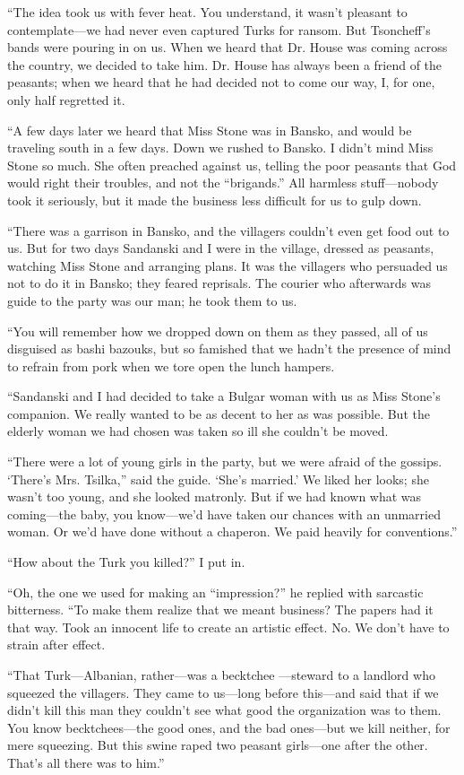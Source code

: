 \documentclass[a5paper,12pt]{book}
\begin{document}
“The idea took us with fever heat. You understand, it wasn’t pleasant to contemplate—we had never even captured Turks for ransom. But Tsoncheff’s bands were pouring in on us. When we heard that Dr. House was coming across the country, we decided to take him. Dr. House has always been a friend of the peasants; when we heard that he had decided not to come our way, I, for one, only half regretted it.

“A few days later we heard that Miss Stone was in Bansko, and would be traveling south in a few days. Down we rushed to Bansko. I didn’t mind Miss Stone so much. She often preached against us, telling the poor peasants that God would right their troubles, and not the “brigands.” All harmless stuff—nobody took it seriously, but it made the business less difficult for us to gulp down.

“There was a garrison in Bansko, and the villagers couldn’t even get food out to us. But for two days Sandanski and I were in the village, dressed as peasants, watching Miss Stone and arranging plans. It was the villagers who persuaded us not to do it in Bansko; they feared reprisals. The courier who afterwards was guide to the party was our man; he took them to us.

“You will remember how we dropped down on them as they passed, all of us disguised as bashi bazouks, but so famished that we hadn’t the presence of mind to refrain from pork when we tore open the lunch hampers.

“Sandanski and I had decided to take a Bulgar woman with us as Miss Stone’s companion. We really wanted to be as decent to her as was possible. But the elderly woman we had chosen was taken so ill she couldn’t be moved.

“There were a lot of young girls in the party, but we were afraid of the gossips. ‘There’s Mrs. Tsilka,” said the guide. ‘She’s married.’ We liked her looks; she wasn’t too young, and she looked matronly. But if we had known what was coming—the baby, you know—we’d have taken our chances with an unmarried woman. Or we’d have done without a chaperon. We paid heavily for conventions.”

“How about the Turk you killed?” I put in.

“Oh, the one we used for making an “impression?” he replied with sarcastic bitterness. “To make them realize that we meant business? The papers had it that way. Took an innocent life to create an artistic effect. No. We don’t have to strain after effect.

“That Turk—Albanian, rather—was a becktchee —steward to a landlord who squeezed the villagers. They came to us—long before this—and said that if we didn’t kill this man they couldn’t see what good the organization was to them. You know becktchees—the good ones, and the bad ones—but we kill neither, for mere squeezing. But this swine raped two peasant girls—one after the other. That's all there was to him.”
\end{document}
